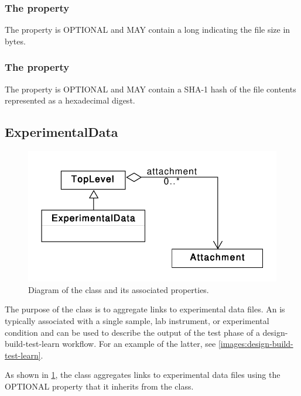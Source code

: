 \subsubsection*{ The  property}\label{sec:size}
The  property is OPTIONAL and MAY contain a long indicating the file size in bytes.

\subsubsection*{ The  property}\label{sec:hash}
The  property is OPTIONAL and MAY contain a SHA-1 hash of the file contents represented as a hexadecimal digest.

\subsection{ExperimentalData}
\label{sec:ExperimentalData}


\begin{figure}[ht]
\begin{center}
\includegraphics[scale=0.6]{uml/experimental_data}
\caption[]{Diagram of the  class and its associated properties.}
\label{uml:experimental_data}
\end{center}
\end{figure}

The purpose of the  class is to aggregate links to experimental data files. An  is typically associated with a single sample, lab instrument, or experimental condition and can be used to describe the output of the test phase of a design-build-test-learn workflow. For an example of the latter, see \ref{images:design-build-test-learn}.

As shown in \ref{uml:experimental_data}, the  class aggregates links to experimental data files using the OPTIONAL  property that it inherits from the  class.

